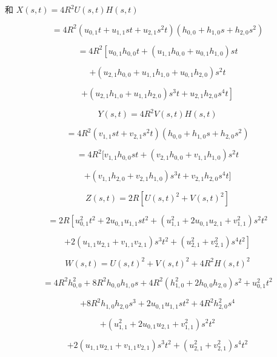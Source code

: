 \documentclass[../main.tex]{subfiles}
\begin{document}
和 \(X\left( {s,t}\right)  = 4{R}^{2}U\left( {s,t}\right) H\left( {s,t}\right)\)

\[
= 4{R}^{2}\left( {{u}_{0,1}t + {u}_{1,1}{st} + {u}_{2,1}{s}^{2}t}\right) \left( {{h}_{0,0} + {h}_{1,0}s + {h}_{2,0}{s}^{2}}\right)
\]

\[
= 4{R}^{2}\left\lbrack  {{u}_{0,1}{h}_{0,0}t + \left( {{u}_{1,1}{h}_{0,0} + {u}_{0,1}{h}_{1,0}}\right) {st}}\right.
\]

\[
+ \left( {{u}_{2,1}{h}_{0,0} + {u}_{1,1}{h}_{1,0} + {u}_{0,1}{h}_{2,0}}\right) {s}^{2}t
\]

\[
\left. {+\left( {{u}_{2,1}{h}_{1,0} + {u}_{1,1}{h}_{2,0}}\right) {s}^{3}t + {u}_{2,1}{h}_{2,0}{s}^{4}t}\right\rbrack   \tag{8.23}
\]

\[
Y\left( {s,t}\right)  = 4{R}^{2}V\left( {s,t}\right) H\left( {s,t}\right)
\]

\[
= 4{R}^{2}\left( {{v}_{1,1}{st} + {v}_{2,1}{s}^{2}t}\right) \left( {{h}_{0,0} + {h}_{1,0}s + {h}_{2,0}{s}^{2}}\right)
\]

\[
= 4{R}^{2}\lbrack {v}_{1,1}{h}_{0,0}{st} + \left( {{v}_{2,1}{h}_{0,0} + {v}_{1,1}{h}_{1,0}}\right) {s}^{2}t
\]

\[
+ \left( {{v}_{1,1}{h}_{2,0} + {v}_{2,1}{h}_{1,0}}\right) {s}^{3}t + {v}_{2,1}{h}_{2,0}{s}^{4}t\rbrack  \tag{8.24}
\]

\[
Z\left( {s,t}\right)  = {2R}\left\lbrack  {U{\left( s,t\right) }^{2} + V{\left( s,t\right) }^{2}}\right\rbrack
\]

\[
= {2R}\left\lbrack  {{u}_{0,1}^{2}{t}^{2} + 2{u}_{0,1}{u}_{1,1}s{t}^{2} + \left( {{u}_{1,1}^{2} + 2{u}_{0,1}{u}_{2,1} + {v}_{1,1}^{2}}\right) {s}^{2}{t}^{2}}\right.
\]

\[
\left. {+2\left( {{u}_{1,1}{u}_{2,1} + {v}_{1,1}{v}_{2,1}}\right) {s}^{3}{t}^{2} + \left( {{u}_{2,1}^{2} + {v}_{2,1}^{2}}\right) {s}^{4}{t}^{2}}\right\rbrack   \tag{8.25}
\]

\[
W\left( {s,t}\right)  = U{\left( s,t\right) }^{2} + V{\left( s,t\right) }^{2} + 4{R}^{2}H{\left( s,t\right) }^{2}
\]

\[
= 4{R}^{2}{h}_{0,0}^{2} + 8{R}^{2}{h}_{0,0}{h}_{1,0}s + 4{R}^{2}\left( {{h}_{1,0}^{2} + 2{h}_{0,0}{h}_{2,0}}\right) {s}^{2} + {u}_{0,1}^{2}{t}^{2}
\]

\[
+ 8{R}^{2}{h}_{1,0}{h}_{2,0}{s}^{3} + 2{u}_{0,1}{u}_{1,1}s{t}^{2} + 4{R}^{2}{h}_{2,0}^{2}{s}^{4}
\]

\[
+ \left( {{u}_{1,1}^{2} + 2{u}_{0,1}{u}_{2,1} + {v}_{1,1}^{2}}\right) {s}^{2}{t}^{2}
\]

\[
+ 2\left( {{u}_{1,1}{u}_{2,1} + {v}_{1,1}{v}_{2,1}}\right) {s}^{3}{t}^{2} + \left( {{u}_{2,1}^{2} + {v}_{2,1}^{2}}\right) {s}^{4}{t}^{2} \tag{8.26}
\]
\end{document}
